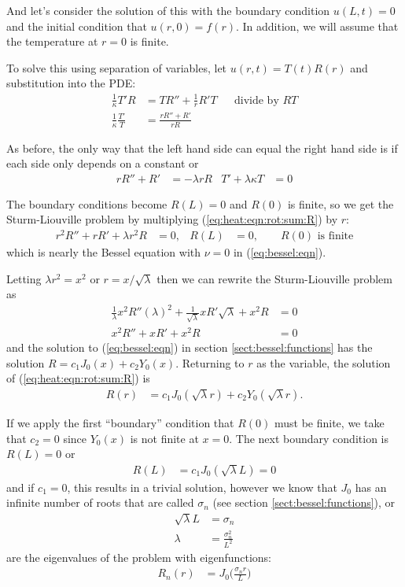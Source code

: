 And let's consider the solution of this with the boundary condition $u(L,t)=0$ and the initial condition that $u(r,0)=f(r)$.  In addition, we will assume that the temperature at $r=0$ is finite.


To solve this using separation of variables, let $u(r,t)=T(t) R(r)$ and substitution into the PDE:
%
\begin{align*}
\frac{1}{\kappa} T'R & = TR'' + \frac{1}{r} R' T && \text{divide by $RT$} \\
\frac{1}{\kappa} \frac{T'}{T} & = \frac{r R'' + R'}{r R}
\end{align*}

As before, the only way that the left hand side can equal the right hand side is if each side only depends on a constant or
%
\begin{align}
r R'' + R' & = -\lambda r R & T' + \lambda \kappa T & = 0
\label{eq:heat:eqn:rot:sym:R:T}
\end{align}

The boundary conditions become $R(L)=0$ and $R(0)$ is finite, so we get the Sturm-Liouville problem by multiplying (\ref{eq:heat:eqn:rot:sum:R}) by $r$:
%
\begin{align}
r^2 R'' + r R' + \lambda r^2 R & = 0, & R(L)& = 0, \qquad  R(0) \text{ is finite}
\label{eq:heat:eqn:rot:sum:R}
\end{align}
which is nearly the Bessel equation with $\nu=0$ in (\ref{eq:bessel:eqn}).

Letting $\lambda r^2 = x^2$ or $r=x/\sqrt{\lambda}$ then we can rewrite the Sturm-Liouville problem as
%
\begin{align*}
\frac{1}{\lambda} x^2  R'' (\lambda)^2 + \frac{1}{\sqrt{\lambda}} x  R' \sqrt{\lambda} + x^2 R & = 0 \\
x^2 R'' + xR' + x^2 R & = 0
\end{align*}
and the solution to (\ref{eq:bessel:eqn}) in section \ref{sect:bessel:functions} has the solution $R= c_1 J_0(x) + c_2 Y_0(x)$.  Returning to $r$ as the variable, the solution of (\ref{eq:heat:eqn:rot:sum:R}) is
%
\begin{align*}
R(r) & = c_1 J_0(\sqrt{\lambda} r) + c_2 Y_0(\sqrt{\lambda} r).
\end{align*}


If we apply the first ``boundary'' condition that $R(0)$ must be finite, we take that $c_2=0$ since $Y_0(x)$ is not finite at $x=0$.  The next boundary condition is $R(L)=0$ or
%
\begin{align*}
R(L) & = c_1 J_0(\sqrt{\lambda} L) = 0
\end{align*}
and if $c_1=0$, this results in a trivial solution, however we know that $J_0$ has an infinite number of roots that are called $\sigma_n$ (see section \ref{sect:bessel:functions}), or
%
\begin{align*}
\sqrt{\lambda} L & = \sigma_n \\
\lambda & = \frac{\sigma_n^2}{L^2}
\end{align*}
are the eigenvalues of the problem with  eigenfunctions:
%
\begin{align*}
R_n(r) & = J_0\biggl(\frac{\sigma_n r}{L}\biggr)
\end{align*}


